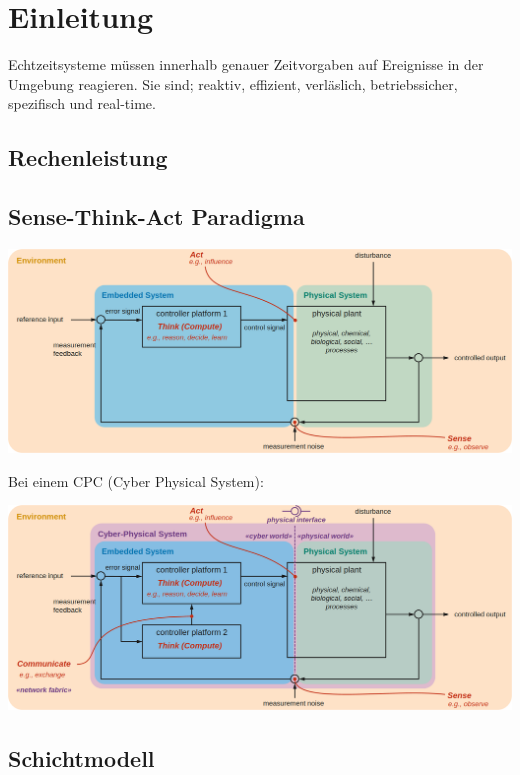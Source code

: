 \section{Einleitung}

Echtzeitsysteme müssen innerhalb genauer Zeitvorgaben auf Ereignisse in der Umgebung reagieren.
Sie sind; reaktiv, effizient, verläslich, betriebssicher, spezifisch und real-time.

\subsection{Rechenleistung}


\subsection{Sense-Think-Act Paradigma}

\includegraphics[width=\linewidth]{"Images/SenseThinkAct.png"}

Bei einem CPC (Cyber Physical System):

\includegraphics[width=\linewidth]{"Images/SenseThinkActCommunicate.png"}

\subsection{Schichtmodell}

